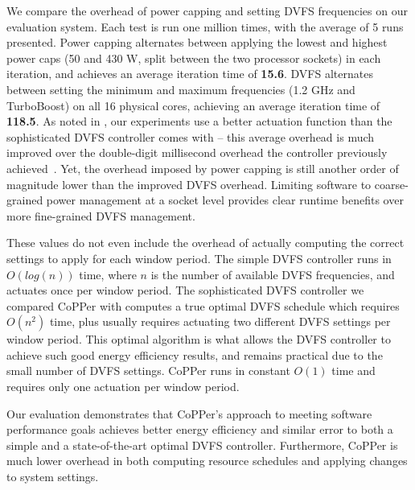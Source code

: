 We compare the overhead of power capping and setting DVFS frequencies on our evaluation system.
Each test is run one million times, with the average of 5 runs presented.
Power capping alternates between applying the lowest and highest power caps (50 and 430 W, split between the two processor sockets) in each iteration, and achieves an average iteration time of \textbf{15.6\us}.
DVFS alternates between setting the minimum and maximum frequencies (1.2 GHz and TurboBoost) on all 16 physical cores, achieving an average iteration time of \textbf{118.5\us}.
As noted in , our experiments use a better actuation function than the sophisticated DVFS controller comes with -- this average overhead is much improved over the double-digit millisecond overhead the controller previously achieved~\cite{POETMCSoC}.
Yet, the overhead imposed by power capping is still another order of magnitude lower than the improved DVFS overhead.
Limiting software to coarse-grained power management at a socket level provides clear runtime benefits over more fine-grained DVFS management.

These values do not even include the overhead of actually computing the correct settings to apply for each window period.
The simple DVFS controller runs in $O(log(n))$ time, where $n$ is the number of available DVFS frequencies, and actuates once per window period.
The sophisticated DVFS controller we compared CoPPer with computes a true optimal DVFS schedule which requires $O(n^2)$ time, plus usually requires actuating two different DVFS settings per window period.
This optimal algorithm is what allows the DVFS controller to achieve such good energy efficiency results, and remains practical due to the small number of DVFS settings.
CoPPer runs in constant $O(1)$ time and requires only one actuation per window period.


Our evaluation demonstrates that CoPPer's approach to meeting software performance goals achieves better energy efficiency and similar error to both a simple and a state-of-the-art optimal DVFS controller.
Furthermore, CoPPer is much lower overhead in both computing resource schedules and applying changes to system settings.
